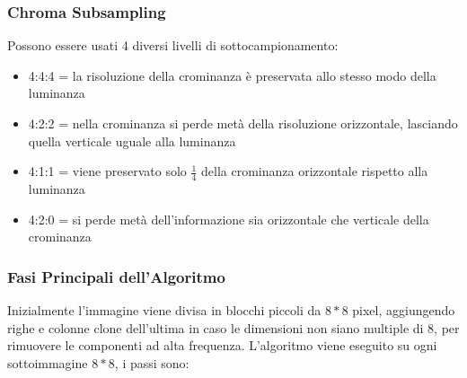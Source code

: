 \documentclass[a4paper,11pt]{article} %
\begin{document}
\subsubsection{Chroma Subsampling}
Possono essere usati 4 diversi livelli di sottocampionamento: 
\begin{itemize}
\item 4:4:4 = la risoluzione della crominanza è preservata allo stesso modo della luminanza
\item 4:2:2 = nella crominanza si perde metà della risoluzione orizzontale, lasciando quella verticale uguale alla luminanza
\item 4:1:1 = viene preservato solo $\frac{1}{4}$ della crominanza orizzontale rispetto alla luminanza
\item 4:2:0 = si perde metà dell'informazione sia orizzontale che verticale della crominanza
\end{itemize}

\subsubsection{Fasi Principali dell'Algoritmo}
Inizialmente l'immagine viene divisa in blocchi piccoli da $8*8$ pixel, aggiungendo righe e colonne clone dell'ultima in caso le dimensioni non siano multiple di $8$, per rimuovere le componenti ad alta frequenza. L'algoritmo viene eseguito su ogni sottoimmagine $8*8$, i passi sono: \\
\end{document}
